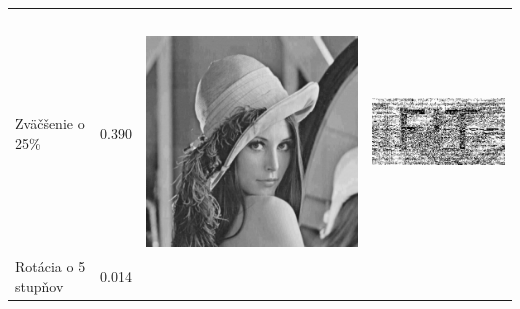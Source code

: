 \begin{table}[h]
\begin{tabular}{llcc}
\begin{minipage}[c]{.15\textwidth}
 \end{minipage} \\
Zväčšenie o 25\%                       & 0.390 &
\begin{minipage}[c]{.1\textwidth}
\ 
  \includegraphics[scale=0.1]{obrazky/scale125}
\end{minipage}
 &
 \begin{minipage}[c]{.15\textwidth}
   \includegraphics[scale=0.25]{obrazky/scale125-wm}
 \end{minipage} \\
Rotácia o 5 stupňov                    & 0.014 &
\begin{minipage}[c]{.1\textwidth}
\ 

\end{minipage}
\end{tabular}
\end{table}
